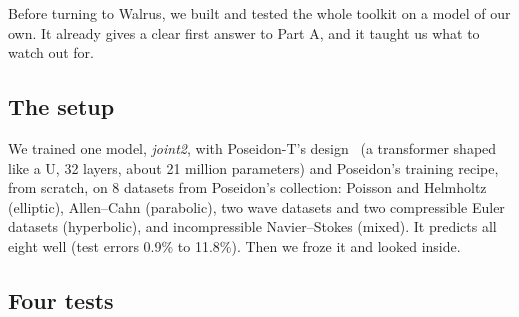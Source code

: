 \documentclass[11pt,a4paper]{article}
\begin{document}
Before turning to Walrus, we built and tested the whole toolkit on a model of our own.
It already gives a clear first answer to Part A, and it taught us what to watch out for.

\subsection{The setup}

We trained one model, \emph{joint2}, with Poseidon-T's design~\cite{poseidon}
(a transformer shaped like a U, 32 layers, about 21 million parameters) and Poseidon's training recipe, from scratch,
on 8 datasets from Poseidon's collection: Poisson and Helmholtz (elliptic), Allen--Cahn (parabolic),
two wave datasets and two compressible Euler datasets (hyperbolic), and incompressible Navier--Stokes (mixed).
It predicts all eight well (test errors 0.9\% to 11.8\%). Then we froze it and looked inside.

\subsection{Four tests}
\end{document}
